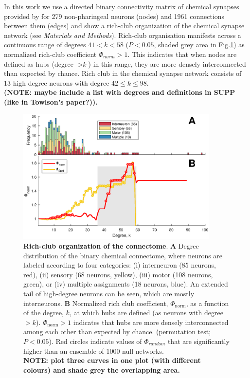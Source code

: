 \documentclass[10pt,letterpaper]{article}
\begin{document}
In this work we use a directed binary connectivity matrix of chemical synapses provided by \citep{Varshney2011} for 279 non-pharingeal neurons (nodes) and 1961 connections between them (edges) and show a rich-club organization of the chemical synapse network (see \textit{Materials and Methods}).
Rich-club organisation manifests across a continuous range of degrees $41<k<58$ ($P<0.05$, shaded grey area in Fig.\ref{RCcoef}) as normalized rich-club coefficient $\Phi_{norm}>1$.
This indicates that when nodes are defined as hubs (degree $>\textit{k}$) in this range, they are more densely interconnected than expected by chance.
Rich club in the chemical synapse network consists of 13 high degree neurons with degree $42 \leq k \leq 98$. \\
\textbf{(NOTE: maybe include a list with degrees and definitions in SUPP (like in Towlson's paper?)).}

\begin{figure}[!h]
   \centering
    \includegraphics[width=0.9\textwidth]{topology_rich.eps}
 \caption{\textbf{Rich-club organization of the connectome}.
\textbf{A} Degree distribution of the binary chemical connectome, where neurons are labeled according to four categories:
(i) interneuron (85 neurons, red),
(ii) sensory (68 neurons, yellow),
(iii) motor (108 neurons, green), or
(iv) multiple assignments (18 neurons, blue).
An extended tail of high-degree neurons can be seen, which are mostly interneurons.
\textbf{B}
Normalized rich club coefficient, $\Phi_\mathrm{norm}$, as a function of the degree, $k$, at which hubs are defined (as neurons with degree $>k$).
$\Phi_\mathrm{norm} > 1$ indicates that hubs are more densely interconnected among each other than expected by chance.
(permutation test; $P<0.05$).
Red circles indicate values of $\Phi_{random}$ that are significantly higher than an ensemble of 1000 null networks.\\
\textbf{NOTE: plot three curves in one plot (with different colours) and shade grey the overlapping area. } }
 \label{RCcoef}
 \end{figure}
\end{document}
